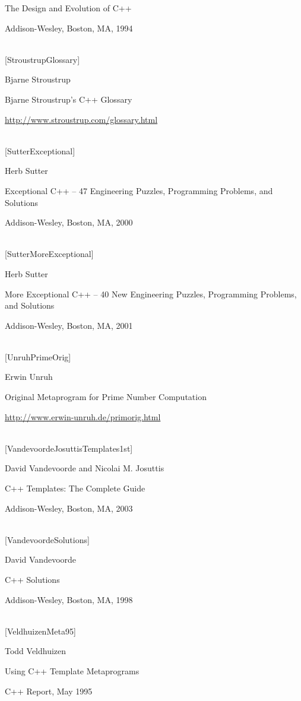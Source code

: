 The Design and Evolution of C++

Addison-Wesley, Boston, MA, 1994

\hspace*{\fill} \\ %
{[StroustrupGlossary]}

Bjarne Stroustrup

Bjarne Stroustrup’s C++ Glossary

\url{http://www.stroustrup.com/glossary.html}

\hspace*{\fill} \\ %
{[SutterExceptional]}

Herb Sutter

Exceptional C++ – 47 Engineering Puzzles, Programming Problems, and Solutions

Addison-Wesley, Boston, MA, 2000

\hspace*{\fill} \\ %
{[SutterMoreExceptional]}

Herb Sutter

More Exceptional C++ – 40 New Engineering Puzzles, Programming Problems, and Solutions

Addison-Wesley, Boston, MA, 2001

\hspace*{\fill} \\ %
{[UnruhPrimeOrig]}

Erwin Unruh

Original Metaprogram for Prime Number Computation

\url{http://www.erwin-unruh.de/primorig.html}

\hspace*{\fill} \\ %
{[VandevoordeJosuttisTemplates1st]}

David Vandevoorde and Nicolai M. Josuttis

C++ Templates: The Complete Guide

Addison-Wesley, Boston, MA, 2003

\hspace*{\fill} \\ %
{[VandevoordeSolutions]}

David Vandevoorde

C++ Solutions

Addison-Wesley, Boston, MA, 1998

\hspace*{\fill} \\ %
{[VeldhuizenMeta95]}

Todd Veldhuizen

Using C++ Template Metaprograms

C++ Report, May 1995























